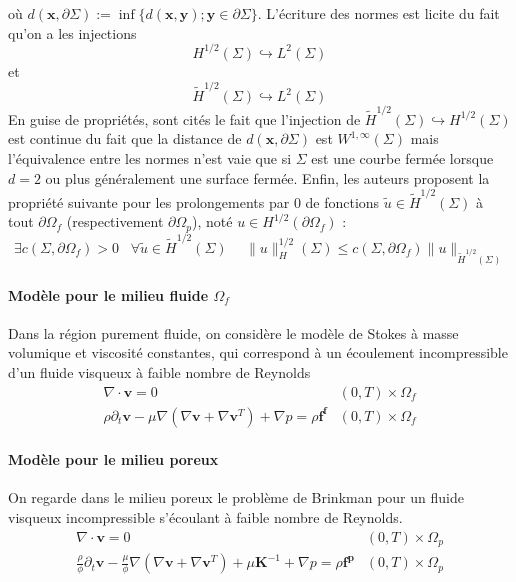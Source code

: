 où $d(\mathbf{x}, \partial \Sigma) := \inf\{ d(\mathbf{x}, \mathbf{y}) ; \mathbf{y} \in \partial \Sigma \}$. L'écriture des normes est licite du fait qu'on a les injections $$ H^{1/2}(\Sigma) \hookrightarrow L^2(\Sigma) $$ et $$ \tilde{H}^{1/2}(\Sigma) \hookrightarrow L^2(\Sigma) $$ En guise de propriétés, sont cités le fait que l'injection de $\tilde{H}^{1/2}(\Sigma) \hookrightarrow H^{1/2}(\Sigma)$ est continue du fait que la distance de $d(\mathbf{x}, \partial \Sigma)$ est $W^{1, \infty}(\Sigma)$ mais l'équivalence entre les normes n'est vaie que si $\Sigma$ est une courbe fermée lorsque $d=2$ ou plus généralement une surface fermée. Enfin, les auteurs proposent la propriété suivante pour les prolongements par $0$ de fonctions $\tilde{u} \in \tilde{H}^{1/2}(\Sigma)$ à tout $\partial \Omega_f$ (respectivement $\partial \Omega_p$), noté $u \in H^{1/2}(\partial \Omega_f)$ : $$ \exists c(\Sigma, \partial \Omega_f) > 0 \hspace{10pt} \forall \tilde{u} \in \tilde{H}^{1/2}(\Sigma) \hspace{15pt} \| u \|_{H}^{1/2}(\Sigma) \leqslant c(\Sigma, \partial \Omega_f) \| u \|_{\tilde{H}^{1/2}(\Sigma)} $$

\paragraph{Modèle pour le milieu fluide $\Omega_f$} Dans la région purement fluide, on considère le modèle de Stokes à masse volumique et viscosité constantes, qui correspond à un écoulement incompressible d'un fluide visqueux à faible nombre de Reynolds
\begin{equation*}
\begin{array}{rr}
    \nabla \cdot \mathbf{v} = 0 & (0, T) \times \Omega_f \\
    \rho \partial_t \mathbf{v} - \mu \nabla \left(\nabla \mathbf{v} + \nabla \mathbf{v}^T\right) + \nabla p = \rho \mathbf{f^f} & (0, T) \times \Omega_f
\end{array}
\end{equation*}

\paragraph{Modèle pour le milieu poreux} On regarde dans le milieu poreux le problème de Brinkman pour un fluide visqueux incompressible s'écoulant à faible nombre de Reynolds.
\begin{equation*}
\begin{array}{rr}
    \nabla \cdot \mathbf{v} = 0 & (0, T) \times \Omega_p \\
    \frac{\rho}{\phi} \partial_t \mathbf{v} - \frac{\mu}{\phi} \nabla \left(\nabla \mathbf{v} + \nabla \mathbf{v}^T\right) + \mu \mathbf{K}^{-1} + \nabla p = \rho \mathbf{f^p} & (0, T) \times \Omega_p
\end{array}
\end{equation*}

